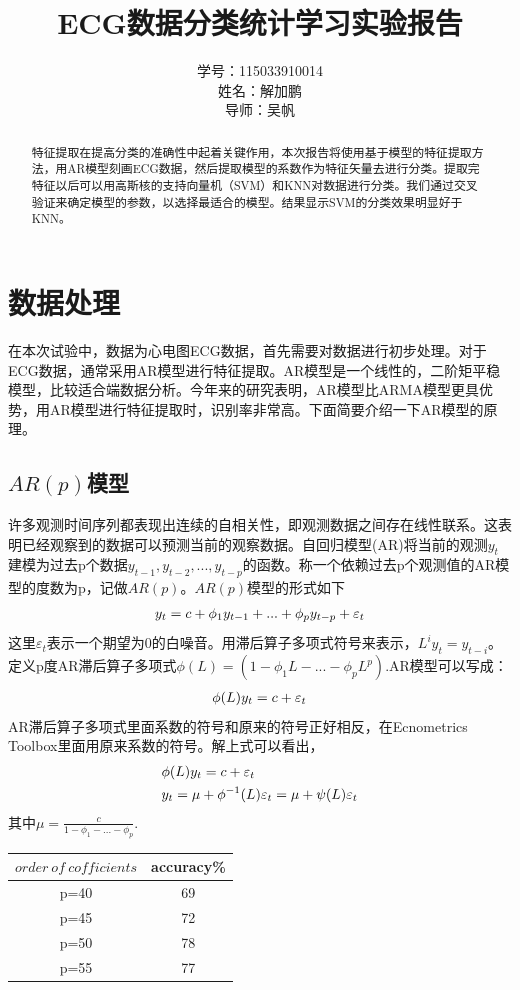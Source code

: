\documentclass[12pt]{elsarticle}
\begin{document}
\begin{frontmatter}
\title{\textbf{ECG数据分类统计学习实验报告}}
\author{学号：115033910014   \\
姓名：解加鹏 \\
导师：吴帆}
   
\begin{abstract}
特征提取在提高分类的准确性中起着关键作用，本次报告将使用基于模型的特征提取方法，用AR模型刻画ECG数据，然后提取模型的系数作为特征矢量去进行分类。提取完特征以后可以用高斯核的支持向量机（SVM）和KNN对数据进行分类。我们通过交叉验证来确定模型的参数，以选择最适合的模型。结果显示SVM的分类效果明显好于KNN。
\end{abstract}
\end{frontmatter}
\section{数据处理}
在本次试验中，数据为心电图ECG数据，首先需要对数据进行初步处理。对于ECG数据，通常采用AR模型进行特征提取。AR模型是一个线性的，二阶矩平稳模型，比较适合端数据分析。今年来的研究表明，AR模型比ARMA模型更具优势，用AR模型进行特征提取时，识别率非常高。下面简要介绍一下AR模型的原理。
\subsection{$AR(p)$模型}
许多观测时间序列都表现出连续的自相关性，即观测数据之间存在线性联系。这表明已经观察到的数据可以预测当前的观察数据。自回归模型(AR)将当前的观测$y_t$建模为过去p个数据$y_{t-1},y_{t-2},...,y_{t-p}$的函数。称一个依赖过去p个观测值的AR模型的度数为p，记做$AR(p)$。$AR(p)$模型的形式如下
\begin{align}
y_t = c + \phi_1y_{t-1}+...+\phi_{p}y_{t-p}+\varepsilon_t \notag
\end{align}
这里$\varepsilon_t$表示一个期望为0的白噪音。用滞后算子多项式符号来表示，$L^iy_t=y_{t-i}$。定义p度AR滞后算子多项式$\phi(L)=(1-\phi_1L-...-\phi_pL^p)$.AR模型可以写成：
\begin{align}
\phi(L)y_t = c+\varepsilon_t \notag
\end{align}
AR滞后算子多项式里面系数的符号和原来的符号正好相反，在Ecnometrics Toolbox里面用原来系数的符号。解上式可以看出，
\begin{align}
&\phi(L)y_t = c+\varepsilon_t \notag\\
&y_t = \mu+\phi^{-1}(L)\varepsilon_t = \mu+\psi(L)\varepsilon_t \notag
\end{align}
其中$\mu = \frac{c}{1-\phi_1-...-\phi_p}$.
\begin{table}[!htbp]
\centering
\begin{tabular}{|c|c|}
\hline
$order\ of\ cofficients$ & accuracy\%\\
\hline
p=40 & 69 \\
\hline
p=45 & 72 \\
\hline
p=50 & 78 \\
\hline
p=55 & 77 \\
\hline
\end{tabular}
\end{table}
\end{document}
